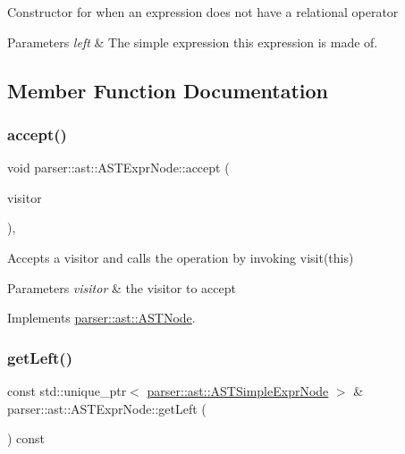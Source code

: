 Constructor for when an expression does not have a relational operator 
\begin{DoxyParams}{Parameters}
{\em left} & The simple expression this expression is made of. \\
\hline
\end{DoxyParams}


\subsection{Member Function Documentation}
\mbox{\label{classparser_1_1ast_1_1ASTExprNode_a3eea258af04a74930acc0c9fb6aade77}} 
\subsubsection{\texorpdfstring{accept()}{accept()}}
{\footnotesize\ttfamily void parser\+::ast\+::\+A\+S\+T\+Expr\+Node\+::accept (\begin{DoxyParamCaption}\item[{\hyperlink{classvisitor_1_1Visitor}{visitor\+::\+Visitor} $\ast$}]{visitor }\end{DoxyParamCaption})\hspace{0.3cm}{\ttfamily [override]}, {\ttfamily [virtual]}}

Accepts a visitor and calls the operation by invoking {\ttfamily visit(this)} 
\begin{DoxyParams}{Parameters}
{\em visitor} & the visitor to accept \\
\hline
\end{DoxyParams}


Implements \hyperlink{classparser_1_1ast_1_1ASTNode_a3ff84fdfdbbc5c39b70b4d04c22e7dc3}{parser\+::ast\+::\+A\+S\+T\+Node}.

\mbox{\label{classparser_1_1ast_1_1ASTExprNode_a19ec44a2b2a38635c6e9cf7fa398fb76}} 
\subsubsection{\texorpdfstring{get\+Left()}{getLeft()}}
{\footnotesize\ttfamily const std\+::unique\+\_\+ptr$<$ \hyperlink{classparser_1_1ast_1_1ASTSimpleExprNode}{parser\+::ast\+::\+A\+S\+T\+Simple\+Expr\+Node} $>$ \& parser\+::ast\+::\+A\+S\+T\+Expr\+Node\+::get\+Left (\begin{DoxyParamCaption}{ }\end{DoxyParamCaption}) const}

